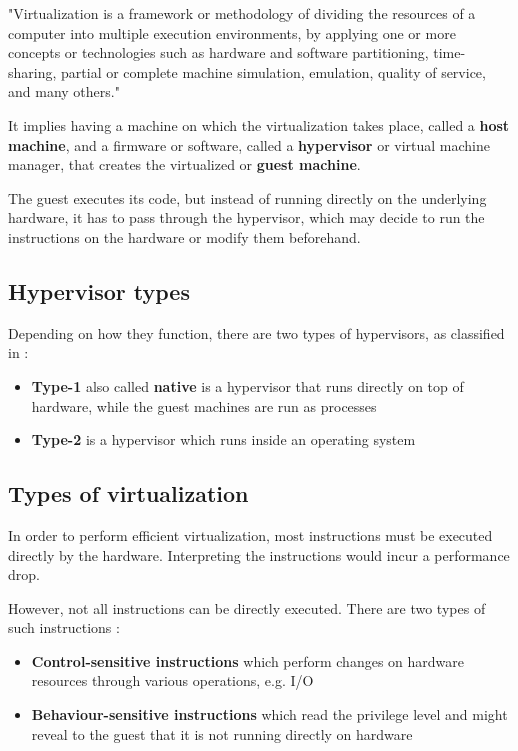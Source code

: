 
"Virtualization is a framework or methodology of dividing the resources of a computer into multiple execution environments, by applying one or more concepts or technologies such as hardware and software partitioning, time-sharing, partial or complete machine simulation, emulation, quality of service, and many others."\cite{intr-virtualization}

It implies having a machine on which the virtualization takes place, called a \textbf{host machine}, and a firmware or software, called a \textbf{hypervisor} or virtual machine manager, that creates the virtualized or \textbf{guest machine}.

The guest executes its code, but instead of running directly on the underlying hardware, it has to pass through the hypervisor, which may decide to run the instructions on the hardware or modify them beforehand.

\subsection{Hypervisor types}
\label{subsec:hypertypes}

Depending on how they function, there are two types of hypervisors, as classified in \cite{formal-virt}:
\begin{itemize}
\item
\textbf{Type-1} also called \textbf{native} is a hypervisor that runs directly on top of hardware, while the guest machines are run as processes
\item
\textbf{Type-2} is a hypervisor which runs inside an operating system
\end{itemize}

\subsection{Types of virtualization}
\label{subsec:typesvirt}

In order to perform efficient virtualization, most instructions must be executed directly by the hardware. Interpreting the instructions would incur a performance drop\cite{virt-embedded}. 

However, not all instructions can be directly executed. There are two types of such instructions\cite{virt-embedded} :
\begin{itemize}
\item
\textbf{Control-sensitive instructions} which perform changes on hardware resources through various operations, e.g. I/O
\item
\textbf{Behaviour-sensitive instructions} which read the privilege level and might reveal to the guest that it is not running directly on hardware
\end{itemize}

